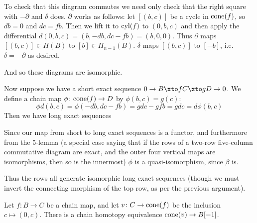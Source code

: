 To check that this diagram commutes we need only check that the right square with $-\partial$ and $\delta$ does.
$\partial$ works as follows: let $[(b,c)]$ be a cycle in ${\rm cone}(f)$, so $db=0$ and $dc=fb$.
Then we lift it to ${\rm cyl}(f)$ to $(0,b,c)$ and then apply the differential $d(0,b,c)=(b,-db,dc-fb)=(b,0,0)$.
Thus $\partial$ maps $[(b,c)]\in H(B)$ to $[b]\in H_{n-1}(B)$.
$\delta$ maps $[(b,c)]$ to $[-b]$, i.e.\ $\delta=-\partial$ as desired.

And so these diagrams are isomorphic.

Now suppose we have a short exact sequence $0\to B\xto fC\xto gD\to0$.
We define a chain map $\phi\colon{\rm cone}(f)\to D$ by $\phi(b,c)=g(c)$:
$$ \phi d(b,c) = \phi(-db,dc-fb) = gdc - gfb = gdc = d\phi(b,c) $$
Then we have long exact sequences

\bigskip
\centerline{}

Since our map from short to long exact sequences is a functor, and furthermore from the $5$-lemma (a special case saying that if the rows of a two-row five-column commutative diagram are exact,
and the outer four vertical maps are isomorphisms, then so is the innermost) $\phi$ is a quasi-isomorphism, since $\beta$ is.

Thus the rows all generate isomorphic long exact sequences (though we must invert the connecting morphism of the top row, as per the previous argument).

\bprop

    Let $f\colon B\to C$ be a chain map, and let $v\colon C\to{\rm cone}(f)$ be the inclusion $c\mapsto(0,c)$.
    There is a chain homotopy equivalence ${\rm cone}(v)\to B[-1]$.

